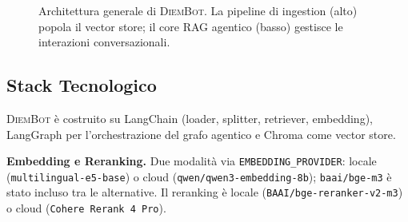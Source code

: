 \documentclass[11pt,a4paper]{article}
\newcommand{\code}[1]{\texttt{\small#1}}
\newcommand{\sys}{\textsc{DiemBot}}
\begin{document}
\begin{figure}[htbp]
  \caption{Architettura generale di \sys{}. La pipeline di ingestion (alto) popola il vector store; il core RAG agentico (basso) gestisce le interazioni conversazionali.}
  \label{fig:arch}
\end{figure}

\subsection{Stack Tecnologico}

\sys{} è costruito su LangChain (loader, splitter, retriever, embedding), LangGraph per
l'orchestrazione del grafo agentico e Chroma come vector store.

\textbf{Embedding e Reranking.} Due modalità via \code{EMBEDDING\_PROVIDER}: locale
(\texttt{multilingual-e5-base}) o cloud (\texttt{qwen/qwen3-embedding-8b});
\texttt{baai/bge-m3} è stato incluso tra le alternative. Il reranking è locale
(\texttt{BAAI/bge-reranker-v2-m3}) o cloud (\texttt{Cohere Rerank~4 Pro}).
\end{document}
